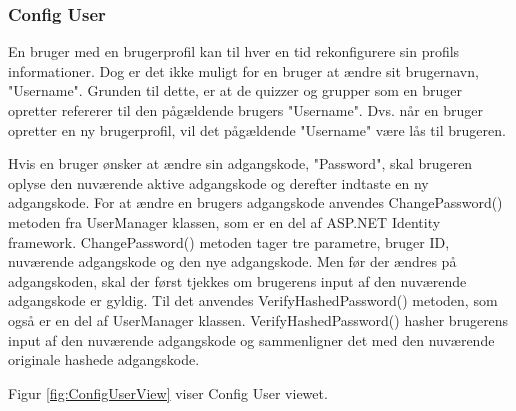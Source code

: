 \subsubsection{Config User}

En bruger med en brugerprofil kan til hver en tid rekonfigurere sin profils informationer. Dog er det ikke muligt for en bruger at ændre sit brugernavn, "Username". Grunden til dette, er at de quizzer og grupper som en bruger opretter refererer til den pågældende brugers "Username". Dvs. når en bruger opretter en ny brugerprofil, vil det pågældende "Username" være lås til brugeren. 

Hvis en bruger ønsker at ændre sin adgangskode, "Password", skal brugeren oplyse den nuværende aktive adgangskode og derefter indtaste en ny adgangskode. For at ændre en brugers adgangskode anvendes ChangePassword() metoden fra UserManager klassen, som er en del af ASP.NET Identity framework. ChangePassword() metoden tager tre parametre, bruger ID, nuværende adgangskode og den nye adgangskode. Men før der ændres på adgangskoden, skal der først tjekkes om brugerens input af den nuværende adgangskode er gyldig. Til det anvendes VerifyHashedPassword() metoden, som også er en del af UserManager klassen. VerifyHashedPassword() hasher brugerens input af den nuværende adgangskode og sammenligner det med den nuværende originale hashede adgangskode. 

Figur \ref{fig:ConfigUserView} viser Config User viewet. 

